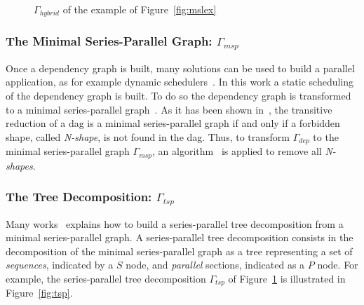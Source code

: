 \begin{figure}[t]
\begin{center}
\caption{$\Gamma_{hybrid}$ of the example of Figure~\ref{fig:mslex}}
\label{fig:hyb}
\end{center}
\end{figure}

\subsubsection*{The Minimal Series-Parallel Graph: $\Gamma_{msp}$}
Once a dependency graph is built, many solutions can be used to build a parallel application, as for example dynamic schedulers~\cite{Augonnet2011,Gautier:2013:XRS:2510661.2511383}. In this work a static scheduling of the dependency graph is built. To do so the dependency graph is transformed to a minimal series-parallel graph~\cite{Valdes:1979:RSP:800135.804393}. As it has been shown in~\cite{Valdes:1979:RSP:800135.804393}, the transitive reduction of a dag is a minimal series-parallel graph if and only if a forbidden shape, called \emph{N-shape}, is not found in the dag. Thus, to transform $\Gamma_{dep}$ to the minimal series-parallel graph $\Gamma_{msp}$, an algorithm~\cite{Mitchell:2004:CMV:1082101.1082117} is applied to remove all \emph{N-shapes}.

\subsubsection*{The Tree Decomposition: $\Gamma_{tsp}$}
Many works~\cite{Valdes:1979:RSP:800135.804393,Schoenmakers95anew} explains how to build a series-parallel tree decomposition from a minimal series-parallel graph. A series-parallel tree decomposition consists in the decomposition of the minimal series-parallel graph as a tree representing a set of \emph{sequences}, indicated by a $S$ node, and \emph{parallel} sections, indicated as a $P$ node. For example, the series-parallel tree decomposition $\Gamma_{tsp}$ of Figure~\ref{fig:hyb} is illustrated in Figure~\ref{fig:tsp}.

